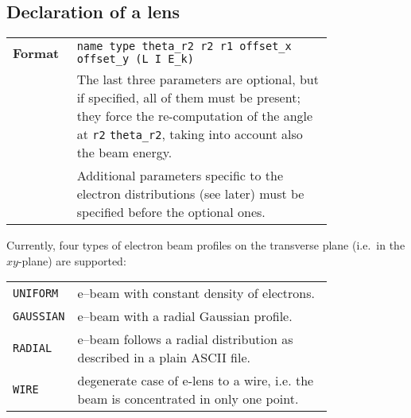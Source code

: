 \subsection{Declaration of a lens}\label{sec:elen:declaration}
\begin{tabular}{@{}lp{0.8\linewidth}}
    \textbf{Format}     & \texttt{name type theta\_r2 r2 r1 offset\_x offset\_y (L I E\_k) } \\
    & The last three parameters are optional, but if specified, all of them must be present; they force the re-computation of the angle at \texttt{r2} \texttt{theta\_r2}, taking into account also the beam energy.  \\
    & Additional parameters specific to the electron distributions (see later) must be specified before the optional ones. \\
\end{tabular}

\bigskip
\noindent Currently, four types of electron beam profiles on the transverse plane (i.e.~in the $xy$-plane) are supported:

\bigskip
\begin{tabular}{@{}lp{0.8\linewidth}}
    \texttt{UNIFORM}  & e--beam with constant density of electrons. \\
    \texttt{GAUSSIAN} & e--beam with a radial Gaussian profile. \\
    \texttt{RADIAL}   & e--beam follows a radial distribution as described in a plain ASCII file. \\
    \texttt{WIRE}     & degenerate case of e-lens to a wire, i.e. the beam is concentrated in only one point. \\
\end{tabular}


